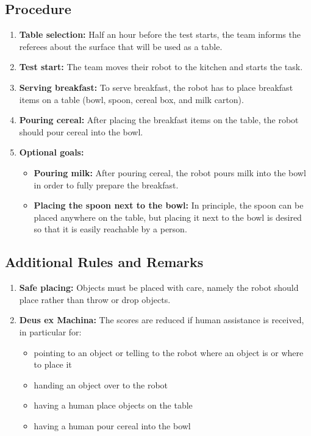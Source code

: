\subsection*{Procedure}
\begin{enumerate}[nosep]
	\item \textbf{Table selection:} Half an hour before the test starts, the team informs the referees about the surface that will be used as a table.
	\item \textbf{Test start:} The team moves their robot to the kitchen and starts the task.
	\item \textbf{Serving breakfast:} To serve breakfast, the robot has to place breakfast items on a table (bowl, spoon, cereal box, and milk carton).
	\item \textbf{Pouring cereal:} After placing the breakfast items on the table, the robot should pour cereal into the bowl.
	\item \textbf{Optional goals:}
		\begin{itemize}
			\item \textbf{Pouring milk:} After pouring cereal, the robot pours milk into the bowl in order to fully prepare the breakfast.
			\item \textbf{Placing the spoon next to the bowl:} In principle, the spoon can be placed anywhere on the table, but placing it next to the bowl is desired so that it is easily reachable by a person.
		\end{itemize}
\end{enumerate}

\subsection*{Additional Rules and Remarks}
\begin{enumerate}[nosep]
	\item \textbf{Safe placing:} Objects must be placed with care, namely the robot should place rather than throw or drop objects.
	\item \textbf{Deus ex Machina:} The scores are reduced if human assistance is received, in particular for:
	\begin{itemize}[nosep]
		\item pointing to an object or telling to the robot where an object is or where to place it
		\item handing an object over to the robot
		\item having a human place objects on the table
		\item having a human pour cereal into the bowl
	\end{itemize}
\end{enumerate}

